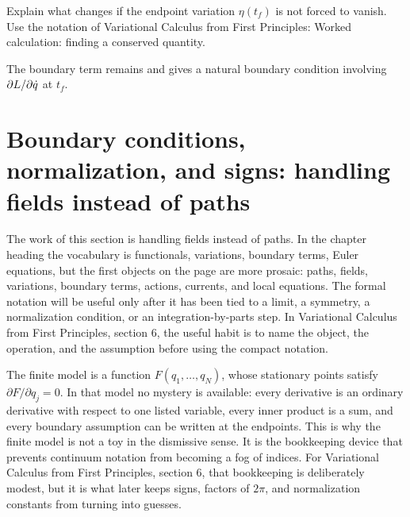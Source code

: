 \begin{exercise}
Explain what changes if the endpoint variation \(\eta(t_f)\) is not forced to vanish.  Use the notation of Variational Calculus from First Principles: Worked calculation: finding a conserved quantity.
\begin{answer}
The boundary term remains and gives a natural boundary condition involving \(\partial L/\partial\dot q\) at \(t_f\).
\end{answer}
\end{exercise}



\section{Boundary conditions, normalization, and signs: handling fields instead of paths}













The work of this section is handling fields instead of paths.  In the chapter heading the vocabulary is functionals, variations, boundary terms, Euler equations, but the first objects on the page are more prosaic: paths, fields, variations, boundary terms, actions, currents, and local equations.  The formal notation will be useful only after it has been tied to a limit, a symmetry, a normalization condition, or an integration-by-parts step.  In Variational Calculus from First Principles, section 6, the useful habit is to name the object, the operation, and the assumption before using the compact notation.

The finite model is a function \(F(q_1,\ldots,q_N)\), whose stationary points satisfy \( \partial F/\partial q_j=0 \).  In that model no mystery is available: every derivative is an ordinary derivative with respect to one listed variable, every inner product is a sum, and every boundary assumption can be written at the endpoints.  This is why the finite model is not a toy in the dismissive sense.  It is the bookkeeping device that prevents continuum notation from becoming a fog of indices.  For Variational Calculus from First Principles, section 6, that bookkeeping is deliberately modest, but it is what later keeps signs, factors of \(2\pi\), and normalization constants from turning into guesses.

